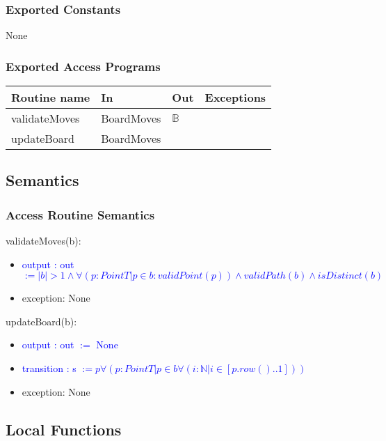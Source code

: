 \documentclass[12pt]{article}
\begin{document}
\subsubsection* {Exported Constants}

None

\subsubsection* {Exported Access Programs}

\begin{tabular}{| l | l | l | p{6cm} |}
\hline
\textbf{Routine name} & \textbf{In} & \textbf{Out} & \textbf{Exceptions}\\
\hline
validateMoves & BoardMoves & $\mathbb{B}$& \\
\hline
updateBoard & BoardMoves &  & \\
\hline
\end{tabular}

\subsection* {Semantics}

\subsubsection* {Access Routine Semantics}

\noindent validateMoves(b): 
\begin{itemize}
\item \textcolor{blue}{output : out $:= |b| > 1 \land \forall ( p : PointT | p \in b : validPoint(p)) \land validPath(b) \land isDistinct(b)$}
\item exception: None
\end{itemize}

\noindent updateBoard(b): 
\begin{itemize}
\item \textcolor{blue}{output : out $ := $ None}
\item \textcolor{blue}{transition : s $ := p\forall (p : PointT | p \in b  \forall(i : \mathbb{N} | i \in [p.row()..1]) )$ }
\item exception: None
\end{itemize}

\subsection*{Local Functions}
\end{document}
